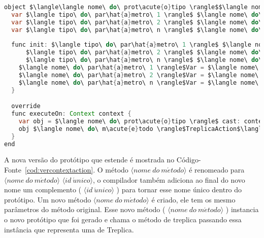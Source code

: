 \begin{lstlisting}[language=Java, caption={Protótipo gerado por \textbf{treplicaAction}}, label={cod:verprotaction}, mathescape=true] 
object $\langle\langle nome\ do\ prot\acute{o}tipo \rangle$$\langle nome\ do\ m\acute{e}todo \rangle\rangle$ extends Action
  var $\langle tipo\ do\ par\hat{a}metro\ 1 \rangle$ $\langle nome\ do\ par\hat{a}metro\ 1 \rangle$Var
  var $\langle tipo\ do\ par\hat{a}metro\ 2 \rangle$ $\langle nome\ do\ par\hat{a}metro\ 2 \rangle$Var
  var $\langle tipo\ do\ par\hat{a}metro\ n \rangle$ $\langle nome\ do\ par\hat{a}metro\ n \rangle$Var
  
  func init: $\langle tipo\ do\ par\hat{a}metro\ 1 \rangle$ $\langle nome\ do\ par\hat{a}metro\ 1 \rangle$, 
      $\langle tipo\ do\ par\hat{a}metro\ 2 \rangle$ $\langle nome\ do\ par\hat{a}metro\ 2 \rangle$, 
      $\langle tipo\ do\ par\hat{a}metro\ n \rangle$ $\langle nome\ do\ par\hat{a}metro\ n \rangle$ {
    $\langle nome\ do\ par\hat{a}metro\ 1 \rangle$Var = $\langle nome\ do\ par\hat{a}metro\ 1 \rangle$;
    $\langle nome\ do\ par\hat{a}metro\ 2 \rangle$Var = $\langle nome\ do\ par\hat{a}metro\ 2 \rangle$;
    $\langle nome\ do\ par\hat{a}metro\ n \rangle$Var = $\langle nome\ do\ par\hat{a}metro\ n \rangle$;
  }

  override
  func executeOn: Context context {
    var obj = $\langle nome\ do\ prot\acute{o}tipo \rangle$ cast: context;
    obj $\langle nome\ do\ m\acute{e}todo \rangle$TreplicaAction$\langle id\ \acute{u}nico \rangle$: $\langle nome\ do\ par\hat{a}metro\ 1 \rangle$Var, $\langle nome\ do\ par\hat{a}metro\ 2 \rangle$Var, $\langle nome\ do\ par\hat{a}metro\ n \rangle$Var;
  }
end
\end{lstlisting}

A nova versão do protótipo que estende  é mostrada no Código-Fonte~\ref{cod:vercontextaction}. O método $\langle nome\ do\ m\acute{e}todo \rangle$ é renomeado para $\langle nome\ do\ m\acute{e}todo \rangle$ $\langle id\ \acute{u}nico \rangle$, o compilador também adiciona ao final do novo nome um complemento ( $\langle id\ \acute{u}nico \rangle$ ) para tornar esse nome único dentro do protótipo. Um novo método $\langle nome\ do\ m\acute{e}todo \rangle$ é criado, ele tem os mesmo parâmetros do método original. Esse novo método ( $\langle nome\ do\ m\acute{e}todo \rangle$ ) instancia o novo protótipo que foi gerado e chama o método  de treplica passando essa instância que representa uma  de Treplica.

